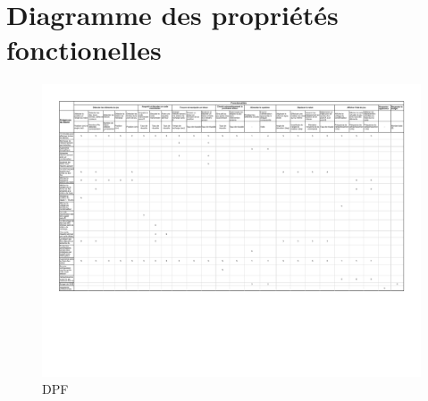\chapter{Diagramme des propriétés fonctionelles}

\begin{landscape}
\begin{figure}[h]
  \centering
  \includegraphics[scale=0.85]{resources/dpf.pdf}
  \caption{DPF}
\end{figure}
\end{landscape}
